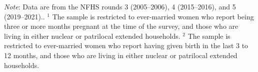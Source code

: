 \documentclass[10pt,twoside,reqno]{article}
\begin{document}
\begin{table}[H]
\sansmath
\sffamily
\captionsetup{style=CAPTAB}
\caption{None of the improvement in the outcomes is explained by changing composition in household structures}
\label{tab:decomposition_outcomes}
\vspace{-4pt}

\begin{scriptsize}
\setlength{\tabcolsep}{4pt}
\renewcommand{\arraystretch}{2.5}
\centering

\end{scriptsize}

\vspace{1ex}
\small\scriptsize{\textsf{\textit{Note}: Data are from the NFHS rounds 3 (2005--2006), 4 (2015--2016), and 5 (2019--2021)..}}
\newline\small\scriptsize{\textsf{$^1$ The sample is restricted to ever-married women who report being three or more months pregnant at the time of the survey, and those who are living in either nuclear or patrilocal extended households.}}
\newline\small\scriptsize{\textsf{$^2$ The sample is restricted to ever-married women who report having given birth in the last 3 to 12 months, and those who are living in either nuclear or patrilocal extended households.}}

\end{table}


\cleardoublepage
\end{document}
